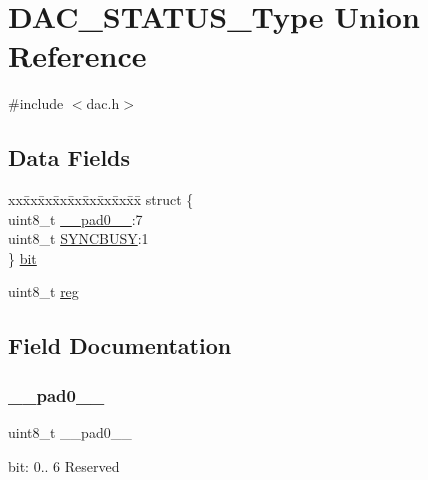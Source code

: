 \hypertarget{union_d_a_c___s_t_a_t_u_s___type}{}\section{D\+A\+C\+\_\+\+S\+T\+A\+T\+U\+S\+\_\+\+Type Union Reference}
\label{union_d_a_c___s_t_a_t_u_s___type}


{\ttfamily \#include $<$dac.\+h$>$}

\subsection*{Data Fields}
\begin{DoxyCompactItemize}
\item 
\begin{tabbing}
xx\=xx\=xx\=xx\=xx\=xx\=xx\=xx\=xx\=\kill
struct \{\\
\>uint8\_t \mbox{\hyperlink{union_d_a_c___s_t_a_t_u_s___type_a8b4eebe79ded0459acec2f4950102ba3}{\_\_pad0\_\_}}:7\\
\>uint8\_t \mbox{\hyperlink{union_d_a_c___s_t_a_t_u_s___type_abb30254758e23bd24824e436a1aa8716}{SYNCBUSY}}:1\\
\} \mbox{\hyperlink{union_d_a_c___s_t_a_t_u_s___type_ac77beba79d68e8ed2a61aa57f6a918e7}{bit}}\\

\end{tabbing}\item 
uint8\+\_\+t \mbox{\hyperlink{union_d_a_c___s_t_a_t_u_s___type_a9428adc9af4653a2050e2536b55dec8d}{reg}}
\end{DoxyCompactItemize}


\subsection{Field Documentation}
\mbox{\label{union_d_a_c___s_t_a_t_u_s___type_a8b4eebe79ded0459acec2f4950102ba3}} 
\subsubsection{\texorpdfstring{\_\_pad0\_\_}{\_\_pad0\_\_}}
{\footnotesize\ttfamily uint8\+\_\+t \+\_\+\+\_\+pad0\+\_\+\+\_\+}

bit\+: 0.. 6 Reserved \mbox{\label{union_d_a_c___s_t_a_t_u_s___type_ac77beba79d68e8ed2a61aa57f6a918e7}} 
